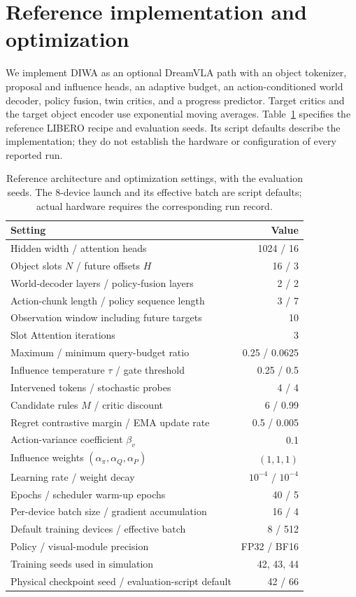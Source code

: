 \documentclass{article}
\newcommand{\method}{DIWA}
\begin{document}



\clearpage
\appendix
\section{Reference implementation and optimization}
\label{app:implementation}
We implement \method{} as an optional DreamVLA path with an object tokenizer, proposal and influence heads, an adaptive budget, an action-conditioned world decoder, policy fusion, twin critics, and a progress predictor. Target critics and the target object encoder use exponential moving averages. Table~\ref{tab:configuration} specifies the reference LIBERO recipe and evaluation seeds. Its script defaults describe the implementation; they do not establish the hardware or configuration of every reported run.

\begin{table}[htbp]
\centering
\caption{Reference architecture and optimization settings, with the evaluation seeds. The 8-device launch and its effective batch are script defaults; actual hardware requires the corresponding run record.}
\label{tab:configuration}
\begin{tabular}{lr}
\toprule
Setting & Value\\
\midrule
Hidden width / attention heads & 1024 / 16\\
Object slots $N$ / future offsets $H$ & 16 / 3\\
World-decoder layers / policy-fusion layers & 2 / 2\\
Action-chunk length / policy sequence length & 3 / 7\\
Observation window including future targets & 10\\
Slot Attention iterations & 3\\
Maximum / minimum query-budget ratio & 0.25 / 0.0625\\
Influence temperature $\tau$ / gate threshold & 0.25 / 0.5\\
Intervened tokens / stochastic probes & 4 / 4\\
Candidate rules $M$ / critic discount & 6 / 0.99\\
Regret contrastive margin / EMA update rate & 0.5 / 0.005\\
Action-variance coefficient $\beta_v$ & 0.1\\
Influence weights $(\alpha_\pi,\alpha_Q,\alpha_P)$ & $(1,1,1)$\\
Learning rate / weight decay & $10^{-4}$ / $10^{-4}$\\
Epochs / scheduler warm-up epochs & 40 / 5\\
Per-device batch size / gradient accumulation & 16 / 4\\
Default training devices / effective batch & 8 / 512\\
Policy / visual-module precision & FP32 / BF16\\
Training seeds used in simulation & 42, 43, 44\\
Physical checkpoint seed / evaluation-script default & 42 / 66\\
\bottomrule
\end{tabular}
\end{table}
\end{document}
